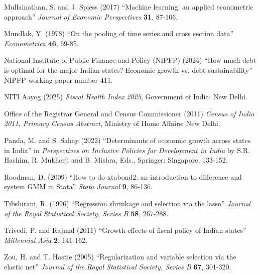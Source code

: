 \documentclass[12pt]{article}
\begin{document}
\hangindent=0.5in
Mullainathan, S. and J. Spiess (2017) ``Machine learning: an applied econometric approach'' \textit{Journal of Economic Perspectives} \textbf{31}, 87-106.

\hangindent=0.5in
Mundlak, Y. (1978) ``On the pooling of time series and cross section data'' \textit{Econometrica} \textbf{46}, 69-85.

\hangindent=0.5in
National Institute of Public Finance and Policy (NIPFP) (2024) ``How much debt is optimal for the major Indian states? Economic growth vs. debt sustainability'' NIPFP working paper number 411.

\hangindent=0.5in
NITI Aayog (2025) \textit{Fiscal Health Index 2025}, Government of India: New Delhi.

\hangindent=0.5in
Office of the Registrar General and Census Commissioner (2011) \textit{Census of India 2011, Primary Census Abstract}, Ministry of Home Affairs: New Delhi.

\hangindent=0.5in
Panda, M. and S. Sahay (2022) ``Determinants of economic growth across states in India'' in \textit{Perspectives on Inclusive Policies for Development in India} by S.R. Hashim, R. Mukherji and B. Mishra, Eds., Springer: Singapore, 133-152.

\hangindent=0.5in
Roodman, D. (2009) ``How to do xtabond2: an introduction to difference and system GMM in Stata'' \textit{Stata Journal} \textbf{9}, 86-136.

\hangindent=0.5in
Tibshirani, R. (1996) ``Regression shrinkage and selection via the lasso'' \textit{Journal of the Royal Statistical Society, Series B} \textbf{58}, 267-288.

\hangindent=0.5in
Trivedi, P. and Rajmal (2011) ``Growth effects of fiscal policy of Indian states'' \textit{Millennial Asia} \textbf{2}, 141-162.

\hangindent=0.5in
Zou, H. and T. Hastie (2005) ``Regularization and variable selection via the elastic net'' \textit{Journal of the Royal Statistical Society, Series B} \textbf{67}, 301-320.
\end{document}
